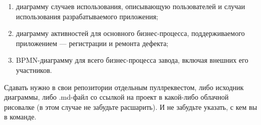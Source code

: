 \documentclass[a5paper]{article}
\begin{document}
\begin{enumerate}
    \item диаграмму случаев использования, описывающую пользователей и случаи использования разрабатываемого приложения;
    \item диаграмму активностей для основного бизнес-процесса, поддерживаемого приложением --- регистрации и ремонта дефекта;
    \item BPMN-диаграмму для всего бизнес-процесса завода, включая внешних его участников.
\end{enumerate}

Сдавать нужно в свои репозитории отдельным пуллреквестом, либо исходник диаграммы, либо .md-файл со ссылкой на проект в какой-либо облачной рисовалке (в этом случае не забудьте расшарить). И не забудьте указать, с кем вы в команде.
\end{document}
